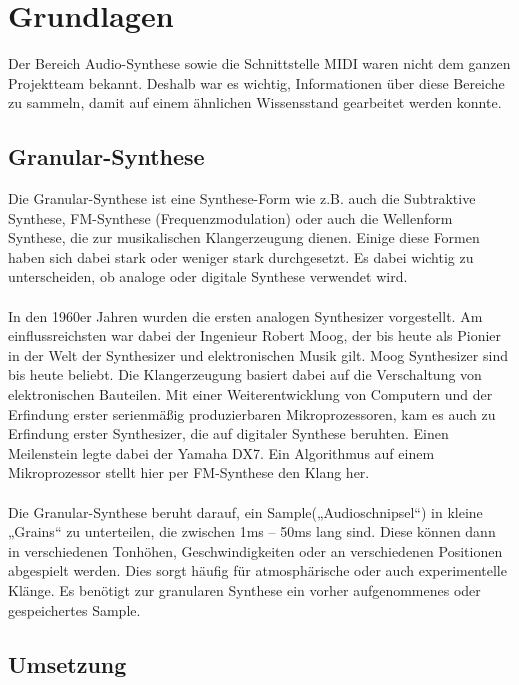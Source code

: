 \documentclass[12pt]{scrartcl}%
\theoremstyle{nonumberplain}
\begin{document}
\section{Grundlagen}

Der Bereich Audio-Synthese sowie die Schnittstelle MIDI waren nicht dem ganzen Projektteam bekannt. Deshalb war es wichtig, Informationen über diese Bereiche zu sammeln, damit auf einem ähnlichen Wissensstand gearbeitet werden konnte.

\subsection{Granular-Synthese}

Die Granular-Synthese ist eine Synthese-Form wie z.B. auch die Subtraktive Synthese, FM-Synthese (Frequenzmodulation) oder auch die Wellenform Synthese, die zur musikalischen Klangerzeugung dienen. Einige diese Formen haben sich dabei stark oder weniger stark durchgesetzt. Es dabei wichtig zu unterscheiden, ob analoge oder digitale Synthese verwendet wird.
\\\\
In den 1960er Jahren wurden die ersten analogen Synthesizer vorgestellt. Am einflussreichsten war dabei der Ingenieur Robert Moog, der bis heute als Pionier in der Welt der Synthesizer und elektronischen Musik gilt. Moog Synthesizer sind bis heute beliebt. Die Klangerzeugung basiert dabei auf die Verschaltung von elektronischen Bauteilen.
Mit einer Weiterentwicklung von Computern und der Erfindung erster serienmäßig produzierbaren Mikroprozessoren, kam es auch zu Erfindung erster Synthesizer, die auf digitaler Synthese beruhten. Einen Meilenstein legte dabei der Yamaha DX7. Ein Algorithmus auf einem Mikroprozessor stellt hier per FM-Synthese den Klang her.
\\\\
Die Granular-Synthese beruht darauf, ein Sample(„Audioschnipsel“) in kleine „Grains“ zu unterteilen, die zwischen 1ms – 50ms lang sind. Diese können dann in verschiedenen Tonhöhen, Geschwindigkeiten oder an verschiedenen Positionen abgespielt werden. Dies sorgt häufig für atmosphärische oder auch experimentelle Klänge. Es benötigt zur granularen Synthese ein vorher aufgenommenes oder gespeichertes Sample.

\subsection{Umsetzung}
\end{document}
